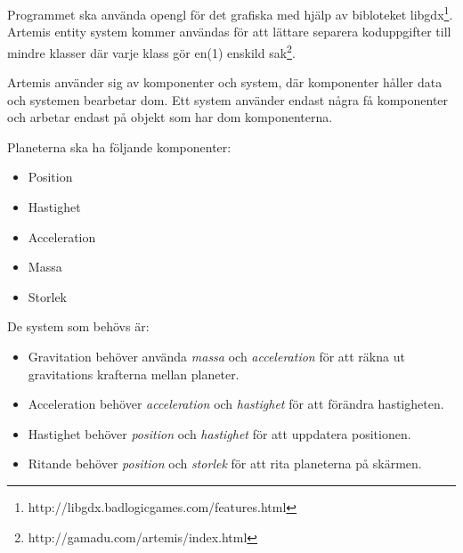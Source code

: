 Programmet ska använda opengl för det grafiska med hjälp av bibloteket
libgdx\footnote{http://libgdx.badlogicgames.com/features.html}.
Artemis entity system kommer användas för att lättare separera
koduppgifter till mindre klasser där varje klass gör en(1) enskild
sak\footnote{http://gamadu.com/artemis/index.html}.

Artemis använder sig av komponenter och system,
där komponenter håller data och systemen bearbetar dom.
Ett system använder endast några få komponenter och
arbetar endast på objekt som har dom komponenterna.

\noindent
Planeterna ska ha följande komponenter:
\begin{itemize}
    \item Position
    \item Hastighet
    \item Acceleration
    \item Massa
    \item Storlek
\end{itemize}

\noindent
De system som behövs är:
\begin{itemize}
    \item Gravitation behöver använda \textit{massa} och \textit{acceleration}
        för att räkna ut gravitations krafterna mellan planeter.
    \item Acceleration behöver \textit{acceleration} och \textit{hastighet}
        för att förändra hastigheten.
    \item Hastighet behöver \textit{position} och \textit{hastighet}
        för att uppdatera positionen.
    \item Ritande behöver \textit{position} och \textit{storlek}
        för att rita planeterna på skärmen.
\end{itemize}

